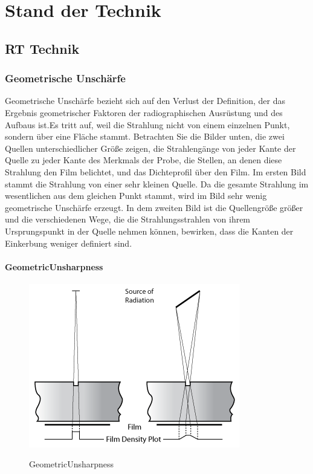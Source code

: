 \chapter{Stand der Technik}
\label{cha:stand_der_technik}

\section{RT Technik}

\subsection{Geometrische Unschärfe }
\label{sec:ndt}

Geometrische Unschärfe bezieht sich auf den Verlust der Definition, der das Ergebnis geometrischer Faktoren der radiographischen Ausrüstung und des Aufbaus ist.Es tritt auf, weil die Strahlung nicht von einem einzelnen Punkt, sondern über eine Fläche stammt.
Betrachten Sie die Bilder unten, die zwei Quellen unterschiedlicher Größe zeigen, die Strahlengänge von jeder Kante der Quelle zu jeder Kante des Merkmals der Probe, die Stellen, an denen diese Strahlung den Film belichtet, und das Dichteprofil über den Film. Im ersten Bild stammt die Strahlung von einer sehr kleinen Quelle. Da die gesamte Strahlung im wesentlichen aus dem gleichen Punkt stammt, wird im Bild sehr wenig geometrische Unschärfe erzeugt. In dem zweiten Bild ist die Quellengröße größer und die verschiedenen Wege, die die Strahlungsstrahlen von ihrem Ursprungspunkt in der Quelle nehmen können, bewirken, dass die Kanten der Einkerbung weniger definiert sind.\\
\subsubsection{GeometricUnsharpness}
\begin{figure}[htb]
\includegraphics[scale=0.5]{img/GeometricUnsharpness.png}\\
\label{sec:GeometricUnsharpness}
  \caption{GeometricUnsharpness}
  \label{sec:geometricUnsharpness1}
  \end{figure}

